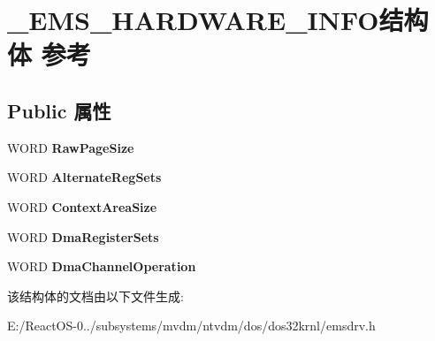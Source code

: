 \hypertarget{struct___e_m_s___h_a_r_d_w_a_r_e___i_n_f_o}{}\section{\+\_\+\+E\+M\+S\+\_\+\+H\+A\+R\+D\+W\+A\+R\+E\+\_\+\+I\+N\+F\+O结构体 参考}
\label{struct___e_m_s___h_a_r_d_w_a_r_e___i_n_f_o}
\subsection*{Public 属性}
\begin{DoxyCompactItemize}
\item 
\mbox{\label{struct___e_m_s___h_a_r_d_w_a_r_e___i_n_f_o_a21f8c893d365f2d20cee13fa8f74d062}} 
W\+O\+RD {\bfseries Raw\+Page\+Size}
\item 
\mbox{\label{struct___e_m_s___h_a_r_d_w_a_r_e___i_n_f_o_a663be31e333ea53db205db1b661f159c}} 
W\+O\+RD {\bfseries Alternate\+Reg\+Sets}
\item 
\mbox{\label{struct___e_m_s___h_a_r_d_w_a_r_e___i_n_f_o_aa9ff44f73aff9edccf0f8aa48982c7da}} 
W\+O\+RD {\bfseries Context\+Area\+Size}
\item 
\mbox{\label{struct___e_m_s___h_a_r_d_w_a_r_e___i_n_f_o_a7bf6705fbe0f72993c9fad3f0fc3bcc4}} 
W\+O\+RD {\bfseries Dma\+Register\+Sets}
\item 
\mbox{\label{struct___e_m_s___h_a_r_d_w_a_r_e___i_n_f_o_a2247963517e3a392af986dbfe3a7aa3e}} 
W\+O\+RD {\bfseries Dma\+Channel\+Operation}
\end{DoxyCompactItemize}


该结构体的文档由以下文件生成\+:\begin{DoxyCompactItemize}
\item 
E\+:/\+React\+O\+S-\/0../subsystems/mvdm/ntvdm/dos/dos32krnl/emsdrv.\+h\end{DoxyCompactItemize}
